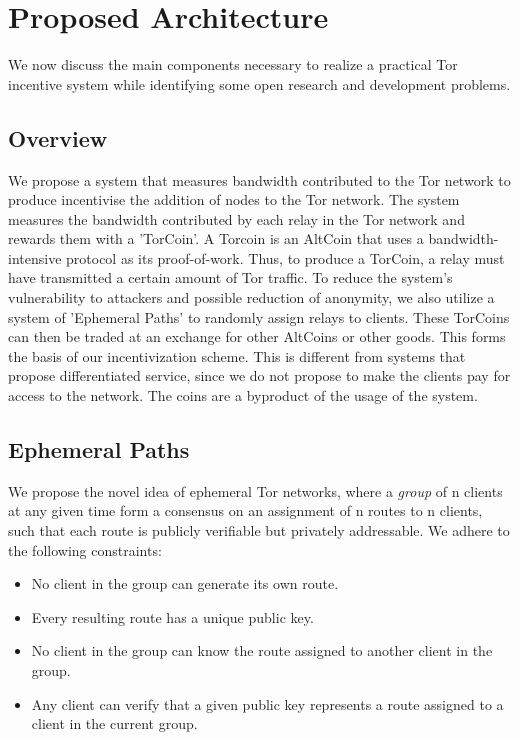 \section{Proposed Architecture} \label{arch}

We now discuss the main components necessary to realize a practical Tor
incentive system while identifying some open research and development problems.

\subsection{Overview}
We propose a system that measures bandwidth contributed to the Tor network to produce incentivise the addition of nodes to the Tor network.
The system measures the bandwidth contributed by each relay in the Tor network and rewards them with a 'TorCoin'. A Torcoin is an AltCoin that uses a bandwidth-intensive protocol as its proof-of-work. Thus, to produce a TorCoin, a relay must have transmitted a certain amount of Tor traffic.
To reduce the system's vulnerability to attackers and possible reduction of anonymity, we also utilize a system of 'Ephemeral Paths' to randomly assign relays to clients.
These TorCoins can then be traded at an exchange for other AltCoins or other goods. This forms the basis of our incentivization scheme. This is different from systems that propose differentiated service\cite{dovrolis1999case, dovrolis2002proportional}, since we do not propose to make the clients pay for access to the network. The coins are a byproduct of the usage of the system.

\subsection{Ephemeral Paths}
We propose the novel idea of ephemeral Tor networks, where a \textit{group} of n clients at any given time form a consensus on an assignment of n routes to n clients, such that each route is publicly verifiable but privately addressable. We adhere to the following constraints:
\begin{itemize}
  \item No client in the group can generate its own route.
  \item Every resulting route has a unique public key.
  \item No client in the group can know the route assigned to another client in the group.
  \item Any client can verify that a given public key represents a route assigned to a client in the current group.
\end{itemize}

